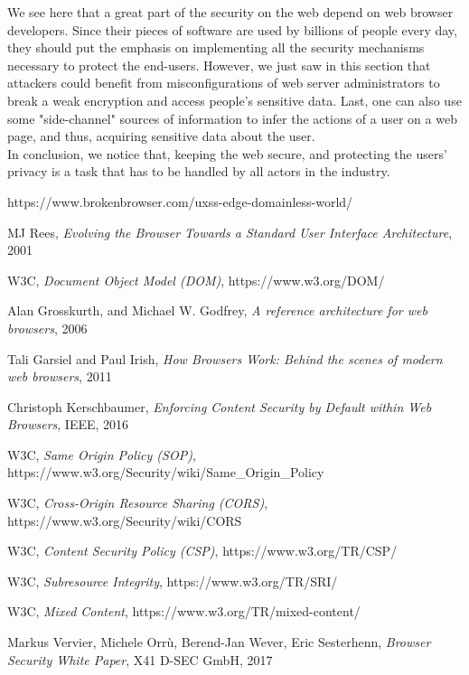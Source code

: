 \documentclass[journal]{IEEEtran}
\begin{document}
We see here that a great part of the security on the web depend on web browser developers. Since their pieces of software are used by billions of people every day, they should put the emphasis on implementing all the security mechanisms necessary to protect the end-users. However, we just saw in this section that attackers could benefit from misconfigurations of web server administrators to break a weak encryption and access people's sensitive data. Last, one can also use some "side-channel" sources of information to infer the actions of a user on a web page, and thus, acquiring sensitive data about the user. \\ 
In conclusion, we notice that, keeping the web secure, and protecting the users' privacy is a task that has to be handled by all actors in the industry.


\begin{thebibliography}{1}

https://www.brokenbrowser.com/uxss-edge-domainless-world/

MJ Rees,
\textit{Evolving the Browser Towards a Standard User Interface Architecture}, 2001

W3C,
\textit{Document Object Model (DOM)},
https://www.w3.org/DOM/

Alan Grosskurth, and Michael W. Godfrey,
\textit{A reference architecture for web browsers}, 2006

Tali Garsiel and Paul Irish,
\textit{How Browsers Work: Behind the scenes of modern web browsers}, 2011

Christoph Kerschbaumer,
\textit{Enforcing Content Security by Default within Web Browsers}, IEEE, 2016

W3C,
\textit{Same Origin Policy (SOP)},
https://www.w3.org/Security/wiki/Same\_Origin\_Policy

W3C,
\textit{Cross-Origin Resource Sharing (CORS)},
https://www.w3.org/Security/wiki/CORS

W3C,
\textit{Content Security Policy (CSP)},
https://www.w3.org/TR/CSP/

W3C,
\textit{Subresource Integrity},
https://www.w3.org/TR/SRI/

W3C,
\textit{Mixed Content},
https://www.w3.org/TR/mixed-content/

Markus Vervier, Michele Orrù, Berend-Jan Wever, Eric Sesterhenn,
\textit{Browser Security White Paper},
X41 D-SEC GmbH, 2017
 

\end{thebibliography}
\end{document}
